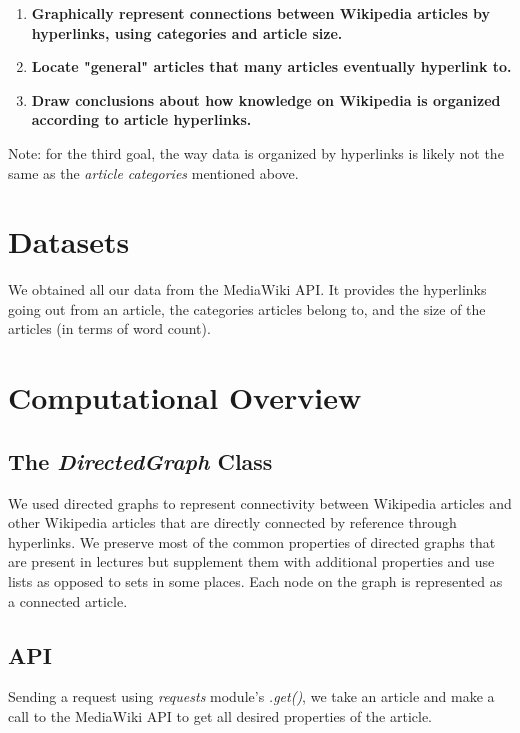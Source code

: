 \documentclass[fontsize=11pt]{article}
\begin{document}
    \begin{enumerate}

    \item{\textbf{Graphically represent connections between Wikipedia articles by hyperlinks, using categories and article size.}}

    \item{\textbf{Locate "general" articles that many articles eventually hyperlink to.}}

    \item{\textbf{Draw conclusions about how knowledge on Wikipedia is organized according to article hyperlinks.}}

    \end{enumerate}

    Note: for the third goal, the way data is organized by hyperlinks is likely not the same as the \textit{article categories} mentioned above.

	\section*{Datasets}
	
	We obtained all our data from the MediaWiki API. It provides the hyperlinks going out from an article, the categories articles belong to, and the size of the articles (in terms of word count). 

\section*{Computational Overview}
    \subsection*{The \textit{DirectedGraph} Class}
    We used directed graphs to represent connectivity between Wikipedia articles and other Wikipedia articles that are directly connected by reference through hyperlinks. We preserve most of the common properties of directed graphs that are present in lectures but supplement them with additional properties and use lists as opposed to sets in some places. Each node on the graph is represented as a connected article.
    
    \subsection*{API}
    Sending a request using \textit{requests} module's \textit{.get()}, we take an article and make a call to the MediaWiki API to get all desired properties of the article. 
\end{document}
